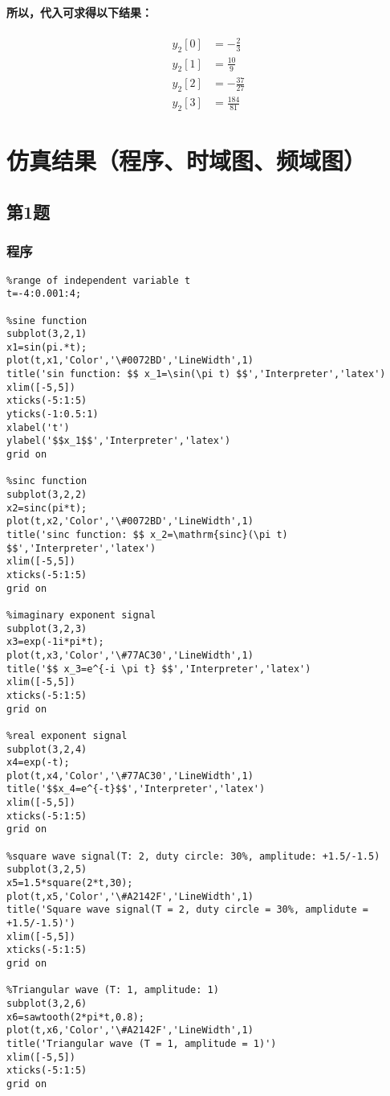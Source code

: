 \documentclass[UTF8]{ctexart}
\begin{document}
\paragraph{
所以，代入可求得以下结果：
}
\begin{align}
y_2[0]&=-\frac{2}{3} \\
y_2[1]&=\frac{10}{9} \\
y_2[2]&=-\frac{37}{27} \\
y_2[3]&=\frac{184}{81}
\end{align}



\newpage
\section{仿真结果（程序、时域图、频域图）}
\subsection{第1题}
\subsubsection{程序}
\begin{lstlisting}
%range of independent variable t
t=-4:0.001:4;

%sine function
subplot(3,2,1)
x1=sin(pi.*t);
plot(t,x1,'Color','\#0072BD','LineWidth',1)
title('sin function: $$ x_1=\sin(\pi t) $$','Interpreter','latex')
xlim([-5,5])
xticks(-5:1:5)
yticks(-1:0.5:1)
xlabel('t')
ylabel('$$x_1$$','Interpreter','latex')
grid on

%sinc function
subplot(3,2,2)
x2=sinc(pi*t);
plot(t,x2,'Color','\#0072BD','LineWidth',1)
title('sinc function: $$ x_2=\mathrm{sinc}(\pi t) $$','Interpreter','latex')
xlim([-5,5])
xticks(-5:1:5)
grid on

%imaginary exponent signal
subplot(3,2,3)
x3=exp(-1i*pi*t);
plot(t,x3,'Color','\#77AC30','LineWidth',1)
title('$$ x_3=e^{-i \pi t} $$','Interpreter','latex')
xlim([-5,5])
xticks(-5:1:5)
grid on

%real exponent signal
subplot(3,2,4)
x4=exp(-t);
plot(t,x4,'Color','\#77AC30','LineWidth',1)
title('$$x_4=e^{-t}$$','Interpreter','latex')
xlim([-5,5])
xticks(-5:1:5)
grid on

%square wave signal(T: 2, duty circle: 30%, amplitude: +1.5/-1.5)
subplot(3,2,5)
x5=1.5*square(2*t,30);
plot(t,x5,'Color','\#A2142F','LineWidth',1)
title('Square wave signal(T = 2, duty circle = 30%, amplidute = +1.5/-1.5)')
xlim([-5,5])
xticks(-5:1:5)
grid on

%Triangular wave (T: 1, amplitude: 1)
subplot(3,2,6)
x6=sawtooth(2*pi*t,0.8);
plot(t,x6,'Color','\#A2142F','LineWidth',1)
title('Triangular wave (T = 1, amplitude = 1)')
xlim([-5,5])
xticks(-5:1:5)
grid on
\end{lstlisting}
\end{document}
